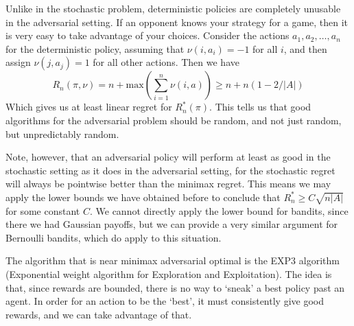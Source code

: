 Unlike in the stochastic problem, deterministic policies are completely unusable in the adversarial setting. If an opponent knows your strategy for a game, then it is very easy to take advantage of your choices. Consider the actions $a_1, a_2, \dots, a_n$ for the deterministic policy, assuming that $\nu(i,a_i) = -1$ for all $i$, and then assign $\nu(j,a_j) = 1$ for all other actions. Then we have
%
\[ R_n(\pi, \nu) = n + \text{max}\left(\sum_{i = 1}^n \nu(i,a) \right) \geq n + n \left( 1-2/|A| \right) \]
%
Which gives us at least linear regret for $R_n^*(\pi)$. This tells us that good algorithms for the adversarial problem should be random, and not just random, but unpredictably random.

Note, however, that an adversarial policy will perform at least as good in the stochastic setting as it does in the adversarial setting, for the stochastic regret will always be pointwise better than the minimax regret. This means we may apply the lower bounds we have obtained before to conclude that $R_n^* \geq C \sqrt{n |A|}$ for some constant $C$. We cannot directly apply the lower bound for bandits, since there we had Gaussian payoffs, but we can provide a very similar argument for Bernoulli bandits, which do apply to this situation.

The algorithm that is near minimax adversarial optimal is the EXP3 algorithm (Exponential weight algorithm for Exploration and Exploitation). The idea is that, since rewards are bounded, there is no way to `sneak' a best policy past an agent. In order for an action to be the `best', it must consistently give good rewards, and we can take advantage of that.

